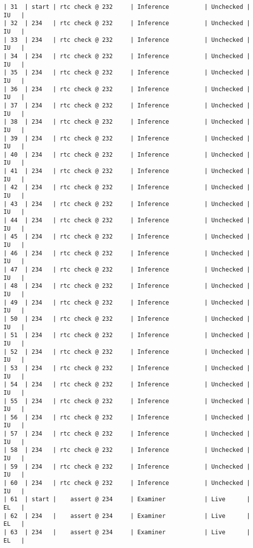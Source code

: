 \begin{lstlisting}[frame=single, gobble=0, caption={POGS report for PCA Pump prototype}]
| 31  | start | rtc check @ 232     | Inference          | Unchecked |   IU   |
| 32  | 234   | rtc check @ 232     | Inference          | Unchecked |   IU   |
| 33  | 234   | rtc check @ 232     | Inference          | Unchecked |   IU   |
| 34  | 234   | rtc check @ 232     | Inference          | Unchecked |   IU   |
| 35  | 234   | rtc check @ 232     | Inference          | Unchecked |   IU   |
| 36  | 234   | rtc check @ 232     | Inference          | Unchecked |   IU   |
| 37  | 234   | rtc check @ 232     | Inference          | Unchecked |   IU   |
| 38  | 234   | rtc check @ 232     | Inference          | Unchecked |   IU   |
| 39  | 234   | rtc check @ 232     | Inference          | Unchecked |   IU   |
| 40  | 234   | rtc check @ 232     | Inference          | Unchecked |   IU   |
| 41  | 234   | rtc check @ 232     | Inference          | Unchecked |   IU   |
| 42  | 234   | rtc check @ 232     | Inference          | Unchecked |   IU   |
| 43  | 234   | rtc check @ 232     | Inference          | Unchecked |   IU   |
| 44  | 234   | rtc check @ 232     | Inference          | Unchecked |   IU   |
| 45  | 234   | rtc check @ 232     | Inference          | Unchecked |   IU   |
| 46  | 234   | rtc check @ 232     | Inference          | Unchecked |   IU   |
| 47  | 234   | rtc check @ 232     | Inference          | Unchecked |   IU   |
| 48  | 234   | rtc check @ 232     | Inference          | Unchecked |   IU   |
| 49  | 234   | rtc check @ 232     | Inference          | Unchecked |   IU   |
| 50  | 234   | rtc check @ 232     | Inference          | Unchecked |   IU   |
| 51  | 234   | rtc check @ 232     | Inference          | Unchecked |   IU   |
| 52  | 234   | rtc check @ 232     | Inference          | Unchecked |   IU   |
| 53  | 234   | rtc check @ 232     | Inference          | Unchecked |   IU   |
| 54  | 234   | rtc check @ 232     | Inference          | Unchecked |   IU   |
| 55  | 234   | rtc check @ 232     | Inference          | Unchecked |   IU   |
| 56  | 234   | rtc check @ 232     | Inference          | Unchecked |   IU   |
| 57  | 234   | rtc check @ 232     | Inference          | Unchecked |   IU   |
| 58  | 234   | rtc check @ 232     | Inference          | Unchecked |   IU   |
| 59  | 234   | rtc check @ 232     | Inference          | Unchecked |   IU   |
| 60  | 234   | rtc check @ 232     | Inference          | Unchecked |   IU   |
| 61  | start |    assert @ 234     | Examiner           | Live      |   EL   |
| 62  | 234   |    assert @ 234     | Examiner           | Live      |   EL   |
| 63  | 234   |    assert @ 234     | Examiner           | Live      |   EL   |

\end{lstlisting}
